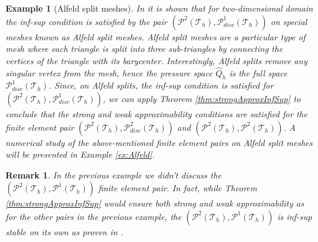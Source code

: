 \documentclass[USenglish]{article}
\theoremstyle{dgthm}
\theoremstyle{dgdef}
\newtheorem{example}{Example}
\newtheorem{remark}{Remark}
\let\vec\bm
\begin{document}
\begin{example}[Alfeld split meshes]
  In \cite{ArnoldQin, FuGuzmanNeilan} it is shown that for two-dimensional domain the inf-sup condition is satisfied by the pair $\left(\vec{\mathcal{P}}^2(\mathcal{T}_h),\mathcal{P}^1_{disc}(\mathcal{T}_h)\right)$ on special meshes known as Alfeld split meshes.
  Alfeld split meshes are a particular type of mesh where each triangle is split into three sub-triangles by connecting the vertices of the triangle with its barycenter.
  Interestingly, Alfeld splits remove any singular vertex from the mesh, hence the pressure space $\hat{Q}_h$ is the full space $\mathcal{P}^1_{disc}(\mathcal{T}_h)$.
  Since, on Alfeld splits, the inf-sup condition is satisfied for $\left(\vec{\mathcal{P}}^2(\mathcal{T}_h),\mathcal{P}^1_{disc}(\mathcal{T}_h)\right)$, we can apply Theorem \ref{thm:strongApproxInfSup} to conclude that the strong and weak approximability conditions are satisfied for the finite element pair $\left(\vec{\mathcal{P}}^2(\mathcal{T}_h),\mathcal{P}^2_{disc}(\mathcal{T}_h)\right)$ and $\left(\vec{\mathcal{P}}^2(\mathcal{T}_h),\mathcal{P}^2(\mathcal{T}_h)\right)$.
  A numerical study of the above-mentioned finite element pairs on Alfeld split meshes will be presented in Example \ref{ex:Alfeld}.
\end{example}
\begin{remark}
  In the previous example we didn't discuss the $\left(\vec{\mathcal{P}}^2(\mathcal{T}_h),\mathcal{P}^1(\mathcal{T}_h)\right)$ finite element pair. In fact, while Theorem \ref{thm:strongApproxInfSup} would ensure both strong and weak approximability as for the other pairs in the previous example, the $\left(\vec{\mathcal{P}}^2(\mathcal{T}_h),\mathcal{P}^1(\mathcal{T}_h)\right)$ is inf-sup stable on its own as proven in \cite{Boffi, HoodTaylor}.
\end{remark}
\end{document}
